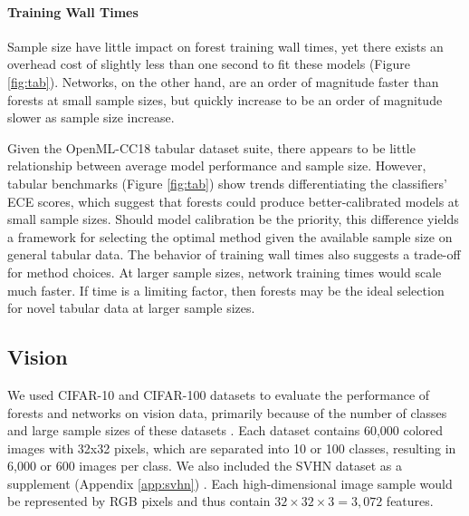 \paragraph{Training Wall Times}
Sample size have little impact on forest training wall times, yet there exists an overhead cost of slightly less than one second to fit these models (Figure \ref{fig:tab}). Networks, on the other hand, are an order of magnitude faster than forests at small sample sizes, but quickly increase to be an order of magnitude slower as sample size increase.

Given the OpenML-CC18 tabular dataset suite, there appears to be little relationship between average model performance and sample size. However, tabular benchmarks (Figure \ref{fig:tab}) show trends differentiating the classifiers' ECE scores, which suggest that forests could produce better-calibrated models at small sample sizes. Should model calibration be the priority, this difference yields a framework for selecting the optimal method given the available sample size on general tabular data. The behavior of training wall times also suggests a trade-off for method choices. At larger sample sizes, network training times would scale much faster. If time is a limiting factor, then forests may be the ideal selection for novel tabular data at larger sample sizes.


\subsection{Vision}
\label{vision}
We used CIFAR-10 and CIFAR-100 datasets to evaluate the performance of forests and networks on vision data, primarily because of the number of classes and large sample sizes of these datasets \citep{cifar}.
Each dataset contains 60,000 colored images with 32x32 pixels, which are separated into 10 or 100 classes, resulting in 6,000 or 600 images per class.
We also included the SVHN dataset as a supplement (Appendix \ref{app:svhn}) \citep{svhn}. 
Each high-dimensional image sample would be represented by RGB pixels and thus contain $32 \times 32 \times 3 = 3,072$ features.

